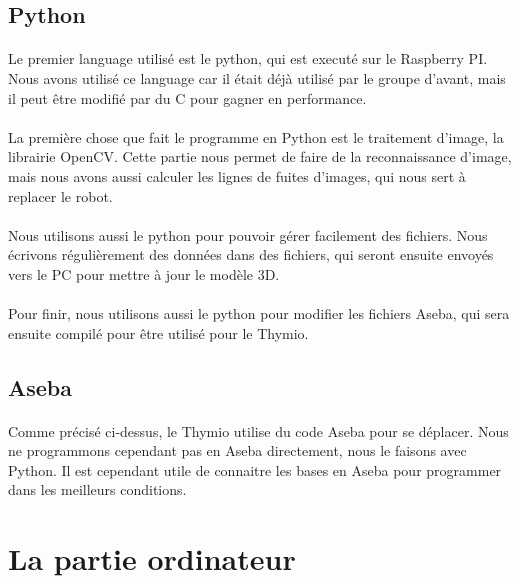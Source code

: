 \documentclass[12pt]{report}
\begin{document}
\subsection{Python}
\paragraph{}
Le premier language utilisé est le python, qui est executé sur le Raspberry PI. Nous avons utilisé ce language car il était déjà utilisé par le groupe d'avant, mais il peut être modifié par du C pour gagner en performance.

\paragraph{}
La première chose que fait le programme en Python est le traitement d'image, la librairie OpenCV. Cette partie nous permet de faire de la reconnaissance d'image, mais nous avons aussi calculer les lignes de fuites d'images, qui nous sert à replacer le robot.

\paragraph{}
Nous utilisons aussi le python pour pouvoir gérer facilement des fichiers. Nous écrivons régulièrement des données dans des fichiers, qui seront ensuite envoyés vers le PC pour mettre à jour le modèle 3D.

\paragraph{}
Pour finir, nous utilisons aussi le python pour modifier les fichiers Aseba, qui sera ensuite compilé pour être utilisé pour le Thymio.

\subsection{Aseba}
\paragraph{}
Comme précisé ci-dessus, le Thymio utilise du code Aseba pour se déplacer. Nous ne programmons cependant pas en Aseba directement, nous le faisons avec Python. Il est cependant utile de connaitre les bases en Aseba pour programmer dans les meilleurs conditions.

\section{La partie ordinateur}
\end{document}
